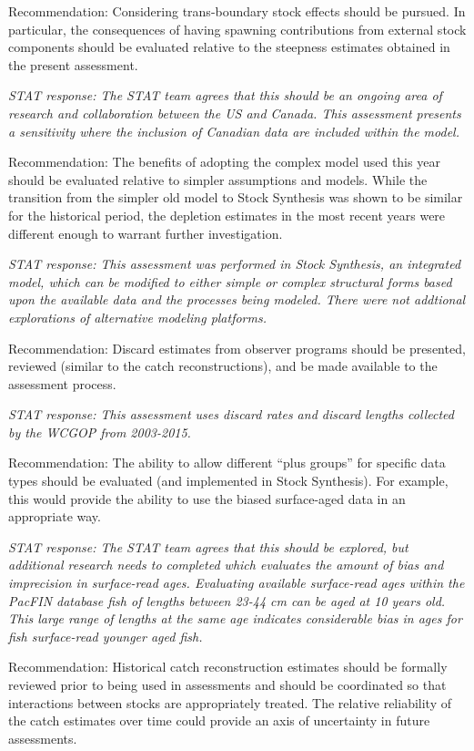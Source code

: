 \documentclass[12pt,]{article}
\begin{document}
Recommendation: Considering trans-boundary stock effects should be
pursued. In particular, the consequences of having spawning
contributions from external stock components should be evaluated
relative to the steepness estimates obtained in the present assessment.

\emph{STAT response: The STAT team agrees that this should be an ongoing
area of research and collaboration between the US and Canada. This
assessment presents a sensitivity where the inclusion of Canadian data
are included within the model.}

Recommendation: The benefits of adopting the complex model used this
year should be evaluated relative to simpler assumptions and models.
While the transition from the simpler old model to Stock Synthesis was
shown to be similar for the historical period, the depletion estimates
in the most recent years were different enough to warrant further
investigation.

\emph{STAT response: This assessment was performed in Stock Synthesis,
an integrated model, which can be modified to either simple or complex
structural forms based upon the available data and the processes being
modeled. There were not addtional explorations of alternative modeling
platforms.}

Recommendation: Discard estimates from observer programs should be
presented, reviewed (similar to the catch reconstructions), and be made
available to the assessment process.

\emph{STAT response: This assessment uses discard rates and discard
lengths collected by the WCGOP from 2003-2015.}

Recommendation: The ability to allow different ``plus groups'' for
specific data types should be evaluated (and implemented in Stock
Synthesis). For example, this would provide the ability to use the
biased surface-aged data in an appropriate way.

\emph{STAT response: The STAT team agrees that this should be explored,
but additional research needs to completed which evaluates the amount of
bias and imprecision in surface-read ages. Evaluating available
surface-read ages within the PacFIN database fish of lengths between
23-44 cm can be aged at 10 years old. This large range of lengths at the
same age indicates considerable bias in ages for fish surface-read
younger aged fish.}

Recommendation: Historical catch reconstruction estimates should be
formally reviewed prior to being used in assessments and should be
coordinated so that interactions between stocks are appropriately
treated. The relative reliability of the catch estimates over time could
provide an axis of uncertainty in future assessments.
\end{document}
